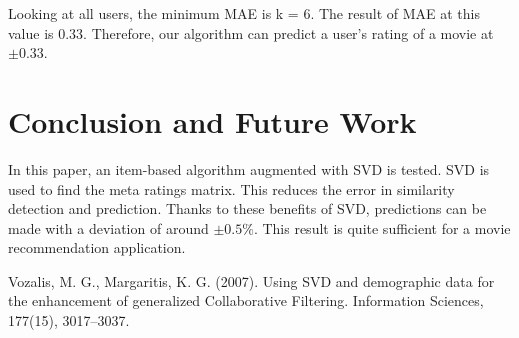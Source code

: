 \documentclass[conference]{IEEEtran}
\begin{document}
	
	Looking at all users, the minimum MAE is k = 6. The result of MAE at this value is 0.33. Therefore, our algorithm can predict a user's rating of a movie at $\pm0.33$. 
	
	\section{Conclusion and Future Work}
	
	In this paper, an item-based algorithm augmented with SVD is tested. SVD is used to find the meta ratings matrix. This reduces the error in similarity detection and prediction. Thanks to these benefits of SVD, predictions can be made with a deviation of around $\pm0.5\%$. This result is quite sufficient for a movie recommendation application.
	
	
	
	
	\begin{thebibliography}{00}
		 Vozalis, M. G., Margaritis, K. G. (2007). Using SVD and demographic data for the enhancement of generalized Collaborative Filtering. Information Sciences, 177(15), 3017–3037.
	\end{thebibliography}
	
	
\end{document}
